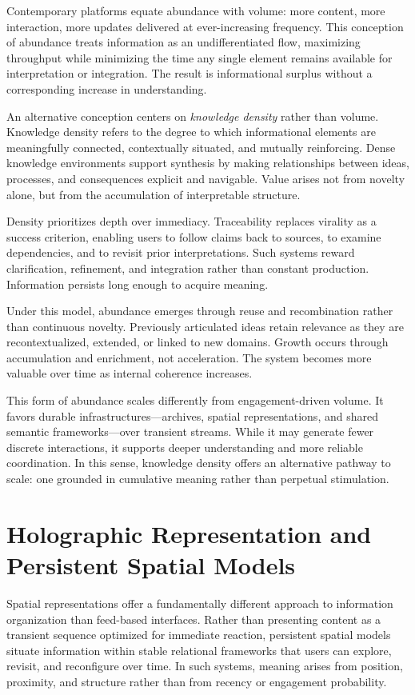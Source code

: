 \documentclass[12pt]{article}
\begin{document}
Contemporary platforms equate abundance with volume: more content, more interaction, more updates delivered at ever-increasing frequency. This conception of abundance treats information as an undifferentiated flow, maximizing throughput while minimizing the time any single element remains available for interpretation or integration. The result is informational surplus without a corresponding increase in understanding.

An alternative conception centers on \emph{knowledge density} rather than volume. Knowledge density refers to the degree to which informational elements are meaningfully connected, contextually situated, and mutually reinforcing. Dense knowledge environments support synthesis by making relationships between ideas, processes, and consequences explicit and navigable. Value arises not from novelty alone, but from the accumulation of interpretable structure.

Density prioritizes depth over immediacy. Traceability replaces virality as a success criterion, enabling users to follow claims back to sources, to examine dependencies, and to revisit prior interpretations. Such systems reward clarification, refinement, and integration rather than constant production. Information persists long enough to acquire meaning.

Under this model, abundance emerges through reuse and recombination rather than continuous novelty. Previously articulated ideas retain relevance as they are recontextualized, extended, or linked to new domains. Growth occurs through accumulation and enrichment, not acceleration. The system becomes more valuable over time as internal coherence increases.

This form of abundance scales differently from engagement-driven volume. It favors durable infrastructures—archives, spatial representations, and shared semantic frameworks—over transient streams. While it may generate fewer discrete interactions, it supports deeper understanding and more reliable coordination. In this sense, knowledge density offers an alternative pathway to scale: one grounded in cumulative meaning rather than perpetual stimulation.

\section{Holographic Representation and Persistent Spatial Models}

Spatial representations offer a fundamentally different approach to information organization than feed-based interfaces. Rather than presenting content as a transient sequence optimized for immediate reaction, persistent spatial models situate information within stable relational frameworks that users can explore, revisit, and reconfigure over time. In such systems, meaning arises from position, proximity, and structure rather than from recency or engagement probability.
\end{document}
